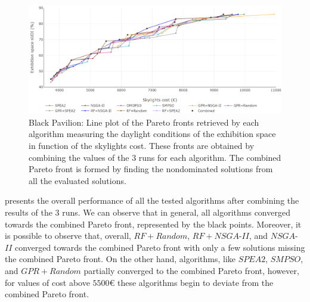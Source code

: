 
\begin{figure}[htbp]
	\centering
	\includegraphics[width=\textwidth]{Images/Evaluation/BlackPavilion/All_Algorithms_all_runs-2019-04-16.png}
	\caption[Black Pavilion: Pareto front plot]{Black Pavilion: Line plot of the Pareto fronts retrieved by each algorithm measuring the daylight conditions of the exhibition space in function of the skylights cost. These fronts are obtained by combining the values of the $3$ runs for each algorithm. The combined Pareto front is formed by finding the nondominated solutions from all the evaluated solutions.}
	\label{fig:blackpavilionallruns}
\end{figure}

 presents the overall performance of all the tested algorithms after combining the results of the $3$ runs. We can observe that in general, all algorithms converged towards the combined Pareto front, represented by the black points. Moreover, it is possible to observe that, overall, $RF+Random$, $RF+NSGA$-$II$, and $NSGA$-$II$ converged towards the combined Pareto front with only a few solutions missing the combined Pareto front. On the other hand, algorithms, like $SPEA2$, $SMPSO$, and $GPR+Random$ partially converged to the combined Pareto front, however, for values of cost above $5500$€ these algorithms begin to deviate from the combined Pareto front.

